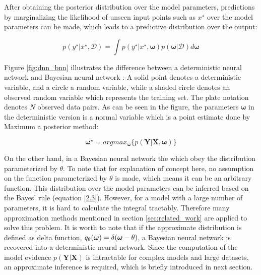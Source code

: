 After obtaining the posterior distribution over the model parameters, predictions by marginalizing the likelihood of unseen input points such as $x^{\star}$ over the model parameters can be made, which leads to a predictive distribution over the output:

\begin{equation}
p(y^{\star}|x^{\star}, \mathcal D) = \int p(y^{\star}|x^{\star}, \boldsymbol{\omega})p(\boldsymbol{\omega}|\mathcal D)d\boldsymbol{\omega}
\label{2.4}
\end{equation}

Figure \ref{fig:dnn_bnn} illustrates the difference between a deterministic neural network and Bayesian neural network : A solid point denotes a deterministic variable, and a circle a random variable, while a shaded circle denotes an observed random variable which represents the training set.
The plate notation denotes $N$ observed data pairs. As can be seen in the figure, the parameters $\boldsymbol{\omega}$ in the deterministic version is a normal variable which is a point estimate done by Maximum a posterior  method:

\begin{equation}
\boldsymbol{\omega^{\star}} = argmax_{\boldsymbol{\omega}}\{p(\mathbf{Y}|\mathbf{X}, \boldsymbol{\omega})\}\label{2.5}
\end{equation}

On the other hand, in a Bayesian neural network the  which obey the distribution parameterized by $\theta$. To note that for explanation of concept here, no assumption on the function parameterized by $\theta$ is made, which means it can be an arbitrary function. This distribution over the model parameters can be inferred based on the Bayes' rule (equation \ref{2.3}). However, for a model with a large number of parameters, it is hard to calculate the integral tractably. Therefore many approximation methods mentioned in section \ref{sec:related_work} are applied to solve this problem. It is worth to note that if the approximate distribution is defined as delta function, $q_{\theta}(\boldsymbol \omega) = \delta(\boldsymbol \omega - \theta)$, a Bayesian neural network is recovered into a deterministic neural network. Since the computation of the model evidence $p(\mathbf{Y}|\mathbf{X})$ is intractable for complex models and large datasets, an approximate inference is required, which is briefly introduced in next section.

